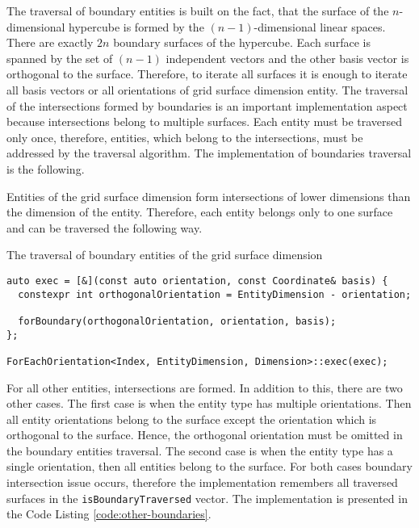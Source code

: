 \vspace{8pt}

The traversal of boundary entities is built on the fact, that the surface of the \(n\)-dimensional hypercube is formed by the \((n-1)\)-dimensional linear spaces.
There are exactly \(2n\) boundary surfaces of the hypercube.
Each surface is spanned by the set of \((n-1)\) independent vectors and the other basis vector is orthogonal to the surface.
Therefore, to iterate all surfaces it is enough to iterate all basis vectors or all orientations of grid surface dimension entity.
The traversal of the intersections formed by boundaries is an important implementation aspect because intersections belong to multiple surfaces.
Each entity must be traversed only once, therefore, entities, which belong to the intersections, must be addressed by the traversal algorithm.
The implementation of boundaries traversal is the following.

Entities of the grid surface dimension form intersections of lower dimensions than the dimension of the entity.
Therefore, each entity belongs only to one surface and can be traversed the following way.

\vspace{8pt}

\begin{listing}[!h]
\caption{The traversal of boundary entities of the grid surface dimension}
\begin{verbatim}
auto exec = [&](const auto orientation, const Coordinate& basis) {
  constexpr int orthogonalOrientation = EntityDimension - orientation;

  forBoundary(orthogonalOrientation, orientation, basis);
};

ForEachOrientation<Index, EntityDimension, Dimension>::exec(exec);
\end{verbatim}
\end{listing}

\vspace{8pt}

For all other entities, intersections are formed.
In addition to this, there are two other cases.
The first case is when the entity type has multiple orientations.
Then all entity orientations belong to the surface except the orientation which is orthogonal to the surface.
Hence, the orthogonal orientation must be omitted in the boundary entities traversal.
The second case is when the entity type has a single orientation, then all entities belong to the surface.
For both cases boundary intersection issue occurs, therefore the implementation remembers all traversed surfaces in the \texttt{isBoundaryTraversed} vector.
The implementation is presented in the Code Listing \ref{code:other-boundaries}.

